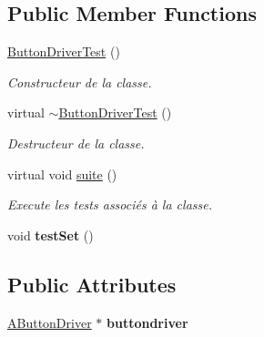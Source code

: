 \subsection*{Public Member Functions}
\begin{DoxyCompactItemize}
\item 
\mbox{\label{classtest_1_1ButtonDriverTest_a9ac8c492a6d8df5d1a3d2b2fe3a6517f}} 
\hyperlink{classtest_1_1ButtonDriverTest_a9ac8c492a6d8df5d1a3d2b2fe3a6517f}{Button\+Driver\+Test} ()
\begin{DoxyCompactList}\small\item\em Constructeur de la classe. \end{DoxyCompactList}\item 
\mbox{\label{classtest_1_1ButtonDriverTest_a92bbcfae7d3a36b16d42f475fbe17a3d}} 
virtual \hyperlink{classtest_1_1ButtonDriverTest_a92bbcfae7d3a36b16d42f475fbe17a3d}{$\sim$\+Button\+Driver\+Test} ()
\begin{DoxyCompactList}\small\item\em Destructeur de la classe. \end{DoxyCompactList}\item 
\mbox{\label{classtest_1_1ButtonDriverTest_a06a94bbe7ca59545db8a99ca3a2537db}} 
virtual void \hyperlink{classtest_1_1ButtonDriverTest_a06a94bbe7ca59545db8a99ca3a2537db}{suite} ()
\begin{DoxyCompactList}\small\item\em Execute les tests associés à la classe. \end{DoxyCompactList}\item 
\mbox{\label{classtest_1_1ButtonDriverTest_a5412bcaf2336784d68d8ed875f3000cc}} 
void {\bfseries test\+Set} ()
\end{DoxyCompactItemize}
\subsection*{Public Attributes}
\begin{DoxyCompactItemize}
\item 
\mbox{\label{classtest_1_1ButtonDriverTest_a2a4e31911e219d1aa45c75b3d75917ec}} 
\hyperlink{classAButtonDriver}{A\+Button\+Driver} $\ast$ {\bfseries buttondriver}
\end{DoxyCompactItemize}
